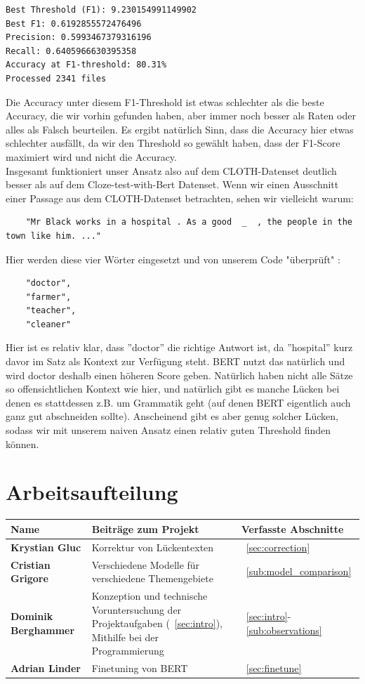 \documentclass[a4paper, 11pt]{article}          %
\begin{document}
\begin{verbatim}
Best Threshold (F1): 9.230154991149902
Best F1: 0.6192855572476496
Precision: 0.5993467379316196
Recall: 0.6405966630395358
Accuracy at F1-threshold: 80.31%
Processed 2341 files
\end{verbatim}
\noindent
Die Accuracy unter diesem F1-Threshold ist etwas schlechter als die beste Accuracy, die wir vorhin gefunden haben, aber immer noch besser als Raten oder alles als Falsch beurteilen. Es ergibt natürlich Sinn, dass die Accuracy hier etwas schlechter ausfällt, da wir den Threshold so gewählt haben, dass der F1-Score maximiert wird und nicht die Accuracy.
\\
Insgesamt funktioniert unser Ansatz also auf dem CLOTH-Datenset deutlich besser als auf dem Cloze-test-with-Bert Datenset. Wenn wir einen Ausschnitt einer Passage aus dem CLOTH-Datenset betrachten, sehen wir vielleicht warum:

\begin{verbatim}
    "Mr Black works in a hospital . As a good  _  , the people in the town like him. ..."
\end{verbatim}
\noindent
Hier werden diese vier Wörter eingesetzt und von unserem Code "überprüft" : 
\begin{verbatim}
    "doctor", 
    "farmer", 
    "teacher", 
    "cleaner"
\end{verbatim}
Hier ist es relativ klar, dass ''doctor'' die richtige Antwort ist, da ''hospital'' kurz davor im Satz als Kontext zur Verfügung steht. BERT nutzt das natürlich und wird doctor deshalb einen höheren Score geben. Natürlich haben nicht alle Sätze so offensichtlichen Kontext wie hier, und natürlich gibt es manche Lücken bei denen es stattdessen z.B. um Grammatik geht (auf denen BERT eigentlich auch ganz gut abschneiden sollte).\cite{goldberg2019} Anscheinend gibt es aber genug solcher Lücken, sodass wir mit unserem naiven Ansatz einen relativ guten Threshold finden können. 
    \newpage
\section*{Arbeitsaufteilung}

\begin{table}[h!]
\centering
\begin{tabular}{|l|p{6cm}|p{5cm}|}
\hline
\textbf{Name} & \textbf{Beiträge zum Projekt} & \textbf{Verfasste Abschnitte} \\ \hline
\textbf{Krystian Gluc} & Korrektur von Lückentexten & ~\ref{sec:correction} \\ \hline
\textbf{Cristian Grigore} & Verschiedene Modelle für verschiedene Themengebiete & ~\ref{sub:model_comparison} \\ \hline
\textbf{Dominik Berghammer} & Konzeption und technische Voruntersuchung der Projektaufgaben (~\ref{sec:intro}), Mithilfe bei der Programmierung & ~\ref{sec:intro}-~\ref{sub:observations} \\ \hline
\textbf{Adrian Linder} & Finetuning von BERT & ~\ref{sec:finetune} \\ \hline
\end{tabular}
\end{table}
\end{document}
